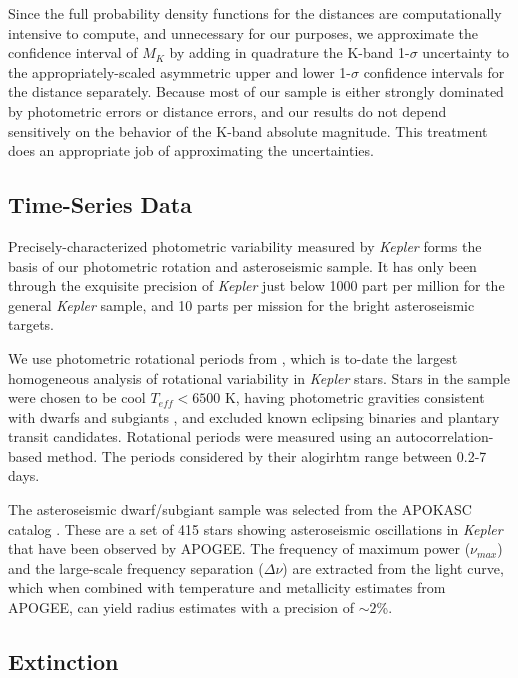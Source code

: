 \documentclass[manuscript]{aastex6}
\newcommand{\Kepler}{\mbox{\textit{Kepler}}}
\newcommand{\Teff}{\ensuremath{T_{eff}}}
\begin{document}
Since the full probability density functions for the distances are
computationally intensive to compute, and unnecessary for our purposes, we
approximate the confidence interval of \(M_K\) by adding in quadrature the 
K-band 1-\(\sigma\) uncertainty to the appropriately-scaled asymmetric upper 
and lower 1-\(\sigma\) confidence intervals for the distance separately. 
Because most of our sample is either strongly dominated by photometric errors 
or distance errors, and our results do not depend sensitively on the behavior 
of the K-band absolute magnitude. This treatment does an appropriate job of
approximating the uncertainties.

\subsection{Time-Series Data}

Precisely-characterized photometric variability measured by \Kepler{} forms the
basis of our photometric rotation and asteroseismic sample. It has only been
through the exquisite precision of \Kepler{} just below 1000 part per million for
the general \Kepler{} sample, and 10 parts per mission for the bright
asteroseismic targets.

We use photometric rotational periods from \citet{McQuillan14}, which is
to-date the largest homogeneous analysis of rotational variability in
\Kepler{} stars. Stars in the \citep{McQuillan14} sample were chosen to be cool
\(\Teff < 6500\) K, having photometric gravities consistent with dwarfs and
subgiants \citet{Brown11}, and excluded known eclipsing binaries and plantary
transit candidates. Rotational periods were measured using an
autocorrelation-based method. The periods considered by their alogirhtm range
between 0.2-7 days.

The asteroseismic dwarf/subgiant sample was selected from the APOKASC catalog
\citet{Serenelli17}. These are a set of 415 stars showing asteroseismic
oscillations in \Kepler{} that have been observed by APOGEE\@. The frequency 
of maximum power (\(\nu_{max}\)) and the large-scale frequency separation
(\(\Delta\nu\)) are extracted from the light curve, which when combined with
temperature and metallicity estimates from APOGEE, can yield radius estimates
with a precision of \(\sim 2\)\%. 

\subsection{Extinction}
\end{document}
